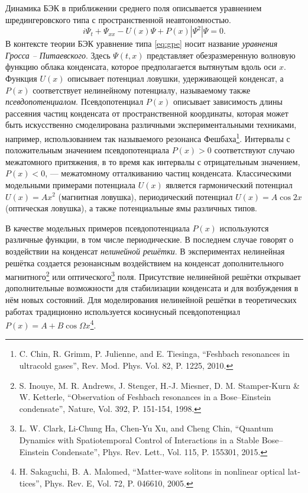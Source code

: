 \documentclass[candidate, href, colorlinks]{disser}
\begin{document}
Динамика БЭК в приближении среднего поля описывается уравнением шредингеровского типа с пространственной неавтономностью.
\begin{equation}
	i \Psi_t + \Psi_{xx} - U(x) \Psi + P(x) |\Psi^2| \Psi = 0.
\label{eq:gpe}
\end{equation}
В контексте теории БЭК уравнение типа \eqref{eq:gpe} носит название {\it уравнения Гросса -- Питаевского}.
Здесь $\Psi(t, x)$ представляет обезразмеренную волновую функцию облака конденсата, которое предполагается вытянутым вдоль оси $x$.
Функция $U(x)$ описывает потенциал ловушки, удерживающей конденсат, а $P(x)$ соответствует нелинейному потенциалу, называемому также {\it псевдопотенциалом}.
Псевдопотенциал $P(x)$ описывает зависимость длины рассеяния частиц конденсата от пространственной координаты, которая может быть искусственно смоделирована различными экспериментальными техниками, например, использованием так называемого резонанса Фешбаха\footnote{C. Chin, R. Grimm, P. Julienne, and E. Tiesinga, ``Feshbach resonances in ultracold gases'', Rev. Mod. Phys. Vol. 82, P. 1225, 2010.}.
Интервалы с положительным значением псевдопотенциала $P(x) > 0$ соответствуют случаю межатомного притяжения, в то время как интервалы с отрицательным значением, $P(x) < 0$, ---  межатомному отталкиванию частиц конденсата.
Классическими модельными примерами потенциала $U(x)$ является гармонический потенциал $U(x) = Ax^2$ (магнитная ловушка), периодический потенциал $U(x) = A \cos 2x$ (оптическая ловушка), а также потенциальные ямы различных типов.

В качестве модельных примеров псевдопотенциала $P(x)$ используются различные функции, в том числе периодические.
В последнем случае говорят о воздействии на конденсат {\it нелинейной решётки}.
В экспериментах нелинейная решётка создается резонансным воздействием на конденсат дополнительного магнитного\footnote{S. Inouye, M. R. Andrews, J. Stenger, H.-J. Miesner, D. M. Stamper-Kurn \& W. Ketterle, ``Observation of Feshbach resonances in a Bose--Einstein condensate'', Nature, Vol. 392, P. 151-154, 1998.} или оптического\footnote{L. W. Clark, Li-Chung Ha, Chen-Yu Xu, and Cheng Chin, ``Quantum Dynamics with Spatiotemporal Control of Interactions in a Stable Bose--Einstein Condensate'', Phys. Rev. Lett., Vol. 115, P. 155301, 2015.} поля.
Присутствие нелинейной решётки открывает дополнительные возможности для стабилизации конденсата и для возбуждения в нём новых состояний.
Для моделирования нелинейной решётки в теоретических работах традиционно используется косинусный псевдопотенциал $P(x) = A + B \cos \Omega x$\footnote{\label{note:malomed} H. Sakaguchi,  B. A. Malomed, ``Matter-wave solitons in nonlinear optical lat­tices'', Phys. Rev. E, Vol. 72, P. 046610, 2005.}.
\end{document}
